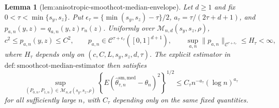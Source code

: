 \documentclass{article}
\newtheorem{lemma}{Lemma}
\begin{document}
\begin{lemma}[lem:anisotropic-smoothcot-median-envelope]\label{lem:anisotropic-smoothcot-median-envelope}
Let \(d\ge1\) and fix \(0<\tau<\min\{s_y,s_z\}\). Put \(\epsilon_\tau=\{\min(s_y,s_z)-\tau\}/2\), \(a_\tau=\tau/(2\tau+d+1)\), and \(p_{a,n}(y,z)=q_{a,n}(y,z)r_n(z)\). Uniformly over \(\mathcal M_{n,d}(s_y,s_z,\rho)\),
\[
c^2\le p_{a,n}(y,z)\le C^2,
\qquad
p_{a,n}\in\mathcal C^{\tau+\epsilon_\tau}([0,1]^{d+1}),
\qquad
\sup_{a,n}\|p_{a,n}\|_{\mathcal C^{\tau+\epsilon_\tau}}\le H_\tau<\infty,
\]
where \(H_\tau\) depends only on \((c,C,L,s_y,s_z,d,\tau)\). The explicit estimator in \(\mathrm{def{:}smoothcot\text{-}median\text{-}estimator}\) then satisfies
\[
\sup_{(P_{0,n},P_{1,n})\in\mathcal M_{n,d}(s_y,s_z,\rho)}
\left\{E(\widehat\theta^{\mathrm{sm,med}}_{\tau,n}-\theta_n)^2\right\}^{1/2}
\le C_\tau n^{-a_\tau}(\log n)^{a_\tau}
\]
for all sufficiently large \(n\), with \(C_\tau\) depending only on the same fixed quantities.
\end{lemma}
\end{document}
